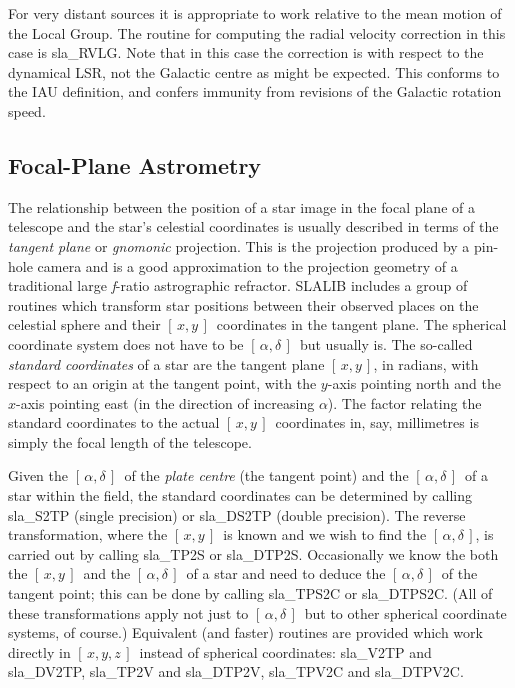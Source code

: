 \documentclass[11pt,twoside]{article}
\newcommand{\radec}     {$[\,\alpha,\delta\,]$}
\newcommand{\xy}        {$[\,x,y\,]$}
\newcommand{\xyz}       {$[\,x,y,z\,]$}
\begin{document}
For very distant sources it is appropriate to work relative
to the mean motion of the Local Group.  The routine for
computing the radial velocity correction in this case is
sla\_RVLG.
Note that in this case the correction is with respect to the
dynamical LSR, not the Galactic centre as might be expected.
This conforms to the IAU definition, and confers immunity from
revisions of the Galactic rotation speed.

\subsection{Focal-Plane Astrometry}
The relationship between the position of a star image in
the focal plane of a telescope and the star's celestial
coordinates is usually described in terms of the {\it tangent plane}\/
or {\it gnomonic}\/ projection.  This is the projection produced
by a pin-hole camera and is a good approximation to the projection
geometry of a traditional large {\it f}\/-ratio astrographic refractor.
SLALIB includes a group of routines which transform
star positions between their observed places on the celestial
sphere and their \xy\ coordinates in the tangent plane.  The
spherical coordinate system does not have to be \radec\ but
usually is.  The so-called {\it standard coordinates}\/ of a star
are the tangent plane \xy, in radians, with respect to an origin
at the tangent point, with the $y$-axis pointing north and
the $x$-axis pointing east (in the direction of increasing $\alpha$).
The factor relating the standard coordinates to
the actual \xy\ coordinates in, say, millimetres is simply
the focal length of the telescope.

Given the \radec\ of the {\it plate centre}\/ (the tangent point)
and the \radec\ of a star within the field, the standard
coordinates can be determined by calling
sla\_S2TP
(single precision) or
sla\_DS2TP
(double precision).  The reverse transformation, where the
\xy\ is known and we wish to find the \radec, is carried out by calling
sla\_TP2S
or
sla\_DTP2S.
Occasionally we know the both the \xy\ and the \radec\ of a 
star and need to deduce the \radec\ of the tangent point;  
this can be done by calling
sla\_TPS2C
or
sla\_DTPS2C.
(All of these transformations apply not just to \radec\ but to
other spherical coordinate systems, of course.)
Equivalent (and faster)
routines are provided which work directly in \xyz\ instead of
spherical coordinates:
sla\_V2TP and
sla\_DV2TP,
sla\_TP2V and
sla\_DTP2V,
sla\_TPV2C and
sla\_DTPV2C.
\end{document}
